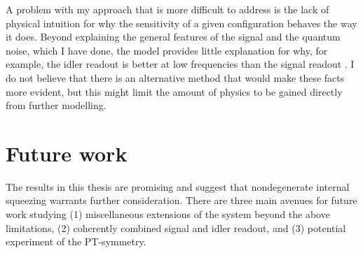 A problem with my approach that is more difficult to address is the lack of physical intuition for why the sensitivity of a given configuration behaves the way it does. Beyond explaining the general features of the signal and the quantum noise, which I have done, the model provides little explanation for why, for example, the idler readout is better at low frequencies than the signal readout . I do not believe that there is an alternative method that would make these facts more evident, but this might limit the amount of physics to be gained directly from further modelling.






\section{Future work}
\label{sec:future_work}

The results in this thesis are promising and suggest that nondegenerate internal squeezing warrants further consideration. There are three main avenues for future work studying (1) miscellaneous extensions of the system beyond the above limitations, (2) coherently combined signal and idler readout, and (3) potential experiment of the PT-symmetry.

